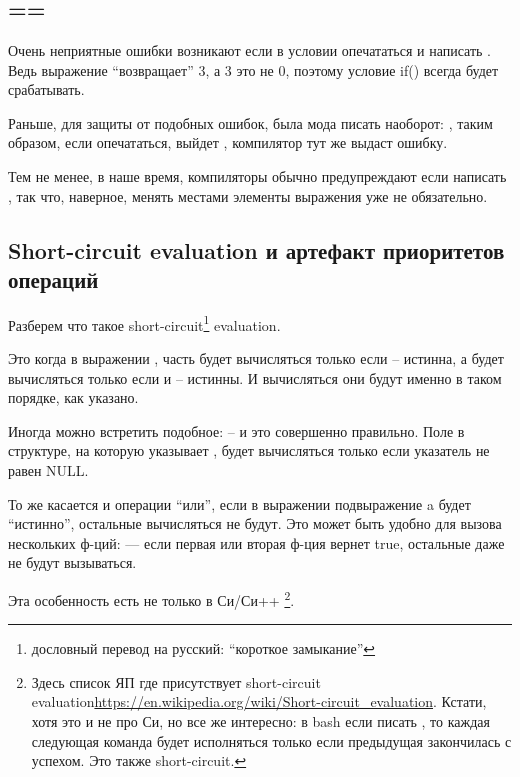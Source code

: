 ﻿\section{}

\subsection{==}

Очень неприятные ошибки возникают если в условии  опечататься и написать .
Ведь выражение  ``возвращает'' 3, а 3 это не 0, поэтому условие if() всегда будет 
срабатывать.

Раньше, для защиты от подобных ошибок, была мода писать наоборот: , таким образом,
если опечататься, выйдет , компилятор тут же выдаст ошибку.

Тем не менее, в наше время, компиляторы обычно предупреждают если написать , 
так что, наверное, менять местами элементы выражения уже не обязательно.

\subsection{Short-circuit evaluation и артефакт приоритетов операций}

Разберем что такое short-circuit\footnote{дословный перевод на русский: ``короткое замыкание''} evaluation.

Это когда в выражении , часть  будет вычисляться только если  -- истинна,
а  будет вычисляться
только если  и  -- истинны. И вычисляться они будут именно в таком порядке, как указано.

Иногда можно встретить подобное:  -- и это совершенно правильно.
Поле  в структуре,
на которую указывает , будет вычисляться только если указатель  не равен NULL.

То же касается и операции ``или'', если в выражении  подвыражение a будет ``истинно'',
остальные вычисляться не будут. Это может быть удобно для вызова нескольких ф-ций: 
 --- если первая или вторая ф-ция вернет true, 
остальные даже не будут вызываться.

Эта особенность есть не только в Си/Си++
\footnote{Здесь список ЯП где присутствует short-circuit evaluation\url{https://en.wikipedia.org/wiki/Short-circuit_evaluation}. Кстати, хотя это и не про Си, но все же интересно: в bash если писать , то каждая следующая команда будет исполняться только если предыдущая закончилась с успехом. Это также short-circuit.}.

